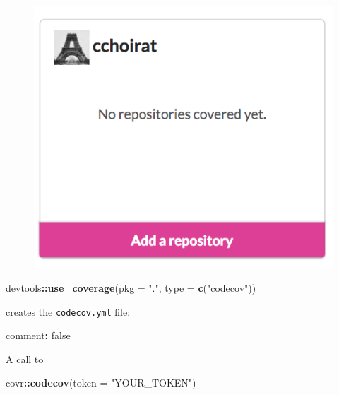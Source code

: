 \documentclass[]{book}
\newenvironment{Shaded}{\begin{snugshade}}{\end{snugshade}}
\newcommand{\KeywordTok}[1]{\textcolor[rgb]{0.13,0.29,0.53}{\textbf{#1}}}
\newcommand{\DataTypeTok}[1]{\textcolor[rgb]{0.13,0.29,0.53}{#1}}
\newcommand{\StringTok}[1]{\textcolor[rgb]{0.31,0.60,0.02}{#1}}
\newcommand{\OperatorTok}[1]{\textcolor[rgb]{0.81,0.36,0.00}{\textbf{#1}}}
\newcommand{\NormalTok}[1]{#1}
\theoremstyle{definition}
\theoremstyle{definition}
\theoremstyle{definition}
\theoremstyle{remark}
\begin{document}
\begin{figure}

{\centering \includegraphics[width=6.38in]{images/ch3_codecov_github} 

}

\end{figure}

\begin{Shaded}
\begin{Highlighting}[]
\NormalTok{devtools}\OperatorTok{::}\KeywordTok{use_coverage}\NormalTok{(}\DataTypeTok{pkg =} \StringTok{"."}\NormalTok{, }\DataTypeTok{type =} \KeywordTok{c}\NormalTok{(}\StringTok{"codecov"}\NormalTok{))}
\end{Highlighting}
\end{Shaded}

creates the \texttt{codecov.yml} file:

\begin{Shaded}
\begin{Highlighting}[]
\NormalTok{comment}\OperatorTok{:}\StringTok{ }\NormalTok{false}
\end{Highlighting}
\end{Shaded}

A call to

\begin{Shaded}
\begin{Highlighting}[]
\NormalTok{covr}\OperatorTok{::}\KeywordTok{codecov}\NormalTok{(}\DataTypeTok{token =} \StringTok{"YOUR_TOKEN"}\NormalTok{)}
\end{Highlighting}
\end{Shaded}
\end{document}
